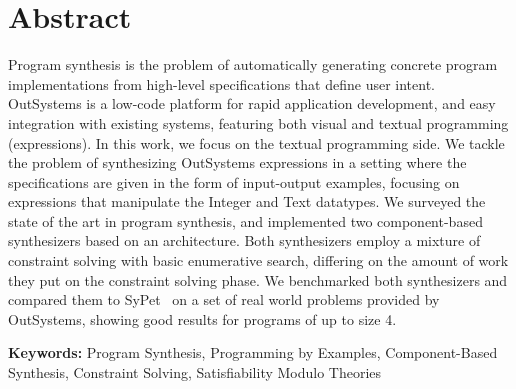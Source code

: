 \section*{Abstract}


Program synthesis is the problem of automatically generating concrete program
implementations from high-level specifications that define user intent.
OutSystems is a low-code platform for rapid application development,
and easy integration with existing systems, featuring both visual and
textual programming (expressions).
In this work, we focus on the textual programming side.
We tackle the problem of synthesizing OutSystems expressions in a setting where
the specifications are given in the form of input-output examples, focusing on
expressions that manipulate the Integer and Text datatypes.
We surveyed the state of the art in program synthesis, and implemented two
component-based  synthesizers based on an 
architecture.
Both synthesizers employ a mixture of constraint solving with basic enumerative
search, differing on the amount of work they put on the constraint solving
phase.
We benchmarked both synthesizers and compared them to
SyPet~\cite{Feng:2017:CSC} on a set of real world problems provided by
OutSystems, showing good results for programs of up to size 4.

\vfill

\textbf{\Large Keywords:} Program Synthesis, Programming by Examples,
Component-Based Synthesis, Constraint Solving, Satisfiability Modulo Theories

\cleardoublepage
